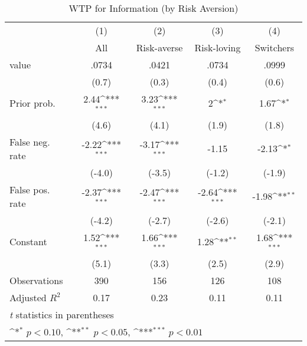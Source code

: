 \begin{table}[htbp]\centering
\def\sym#1{\ifmmode^{#1}\else\(^{#1}\)\fi}
\caption{WTP for Information (by Risk Aversion)}
\begin{tabular}{l*{4}{c}}
\hline\hline
                &\multicolumn{1}{c}{(1)}&\multicolumn{1}{c}{(2)}&\multicolumn{1}{c}{(3)}&\multicolumn{1}{c}{(4)}\\
                &\multicolumn{1}{c}{All}&\multicolumn{1}{c}{Risk-averse}&\multicolumn{1}{c}{Risk-loving}&\multicolumn{1}{c}{Switchers}\\
\hline
value           &    .0734         &    .0421         &    .0734         &    .0999         \\
                &    (0.7)         &    (0.3)         &    (0.4)         &    (0.6)         \\
Prior prob.     &     2.44\sym{***}&     3.23\sym{***}&        2\sym{*}  &     1.67\sym{*}  \\
                &    (4.6)         &    (4.1)         &    (1.9)         &    (1.8)         \\
False neg. rate &    -2.22\sym{***}&    -3.17\sym{***}&    -1.15         &    -2.13\sym{*}  \\
                &   (-4.0)         &   (-3.5)         &   (-1.2)         &   (-1.9)         \\
False pos. rate &    -2.37\sym{***}&    -2.47\sym{***}&    -2.64\sym{***}&    -1.98\sym{**} \\
                &   (-4.2)         &   (-2.7)         &   (-2.6)         &   (-2.1)         \\
Constant        &     1.52\sym{***}&     1.66\sym{***}&     1.28\sym{**} &     1.68\sym{***}\\
                &    (5.1)         &    (3.3)         &    (2.5)         &    (2.9)         \\
\hline
Observations    &      390         &      156         &      126         &      108         \\
Adjusted \(R^{2}\)&     0.17         &     0.23         &     0.11         &     0.11         \\
\hline\hline
\multicolumn{5}{l}{\footnotesize \textit{t} statistics in parentheses}\\
\multicolumn{5}{l}{\footnotesize \sym{*} \(p<0.10\), \sym{**} \(p<0.05\), \sym{***} \(p<0.01\)}\\
\end{tabular}
\end{table}
